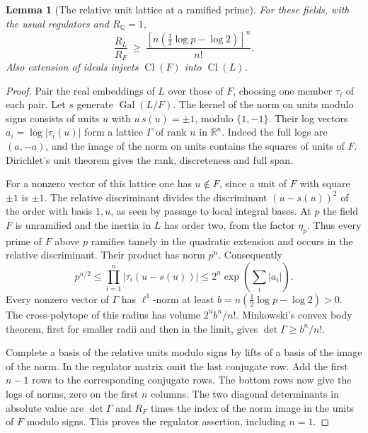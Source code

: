 \documentclass[a4paper,11pt]{article}
\newtheorem{lemma}[proposition]{Lemma}
\theoremstyle{definition}
\theoremstyle{remark}
\numberwithin{equation}{section}
\begin{document}
\begin{lemma}[The relative unit lattice at a ramified prime]
\leavevmode\label{lem:relregulator529}
For these fields, with the usual regulators and \(R_{\mathbb Q}=1\),
\[
       \frac{R_L}{R_F}
          \ \ge\ \frac{[n(\tfrac12\log p-\log 2)]^n}{n!}.
\]
Also extension of ideals injects \(\operatorname{Cl}(F)\) into
\(\operatorname{Cl}(L)\).
\end{lemma}
\begin{proof}
Pair the real embeddings of \(L\) over those of \(F\), choosing one
member \(\tau_i\) of each pair. Let \(s\) generate
\(\operatorname{Gal}(L/F)\). The kernel of the norm on units modulo
signs consists of units \(u\) with \(u\,s(u)=\pm1\), modulo
\(\{1,-1\}\). Their log vectors
\(a_i=\log|\tau_i(u)|\) form a lattice \(\Gamma\) of rank \(n\)
in \(\mathbb R^n\). Indeed the full logs are \((a,-a)\), and the
image of the norm on units contains the squares of units of \(F\).
Dirichlet's unit theorem gives the rank, discreteness and full span.

For a nonzero vector of this lattice one has \(u\notin F\), since
a unit of \(F\) with square \(\pm1\) is \(\pm1\). The relative
discriminant divides the discriminant \((u-s(u))^2\) of the
order with basis \(1,u\), as seen by passage to local integral
bases. At \(p\) the field \(F\) is unramified and the inertia
in \(L\) has order two, from the factor \(\eta_p\). Thus every
prime of \(F\) above \(p\) ramifies tamely in the quadratic
extension and occurs in the relative discriminant. Their product
has norm \(p^n\). Consequently
\[
 p^{n/2}\le\prod_{i=1}^n |\tau_i(u-s(u))|
                  \le 2^n\exp\!\left(\sum_i |a_i|\right).
\]
Every nonzero vector of \(\Gamma\) has \(\ell^1\)-norm at least
\(b=n(\frac12\log p-\log 2)>0\). The cross-polytope of this
radius has volume \(2^n b^n/n!\). Minkowski's convex body
theorem, first for smaller radii and then in the limit, gives
\(\det\Gamma\ge b^n/n!\).

Complete a basis of the relative units modulo signs by lifts of
a basis of the image of the norm. In the regulator matrix omit
the last conjugate row. Add the first \(n-1\) rows to the
corresponding conjugate rows. The bottom rows now give the logs
of norms, zero on the first \(n\) columns. The two diagonal
determinants in absolute value are \(\det\Gamma\) and \(R_F\)
times the index of the norm image in the units of \(F\) modulo
signs. This proves the regulator assertion, including \(n=1\).


\end{proof}
\end{document}
